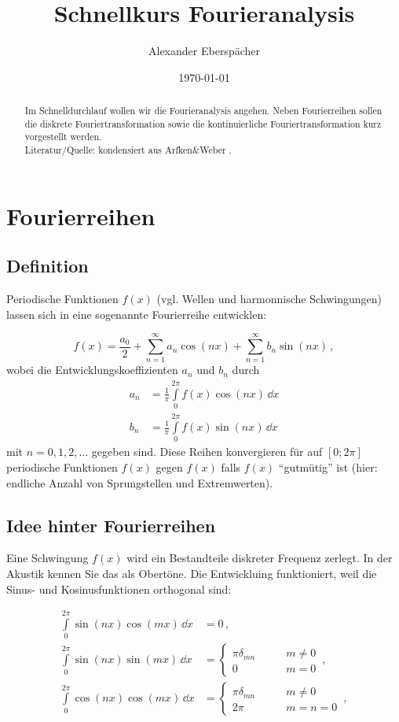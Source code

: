 \documentclass[paper=a4, fontsize=11.0pt, abstractoff, DIV12]{scrartcl}
\title{Schnellkurs Fourieranalysis}
\author{Alexander Eberspächer}
\date{\today}
\begin{document}
\maketitle
\begin{abstract}
Im Schnelldurchlauf wollen wir die Fourieranalysis angehen. Neben Fourierreihen
sollen die diskrete Fouriertransformation sowie die kontinuierliche
Fouriertransformation kurz vorgestellt werden.
\\[0.5ex]
Literatur/Quelle: kondensiert aus Arfken\&Weber \cite{Arfken}.
\end{abstract}

\section{Fourierreihen}

\subsection{Definition}

Periodische Funktionen $f(x)$ (vgl. Wellen und harmonnische Schwingungen)
lassen sich in eine sogenannte Fourierreihe entwicklen:

\begin{equation}
f(x) = \frac{a_0}{2}+\sum\limits_{n=1}^{\infty}a_n\cos(nx) + \sum\limits_{n=1}^{\infty}b_n\sin(nx)\,,
\end{equation}
wobei die Entwicklungskoeffizienten $a_n$ und $b_n$ durch
\begin{align}
a_n &= \frac{1}{\pi}\int\limits_{0}^{2\pi}f(x)\cos(nx)\,\dd x\\
b_n &= \frac{1}{\pi}\int\limits_{0}^{2\pi}f(x)\sin(nx)\,\dd x
\end{align}
mit $n=0,1,2,\dots$ gegeben sind. Diese Reihen konvergieren für auf $[0;2\pi]$
periodische Funktionen $f(x)$ gegen $f(x)$ falls $f(x)$ ``gutmütig'' ist
(hier: endliche Anzahl von Sprungstellen und Extremwerten).

\subsection{Idee hinter Fourierreihen}

Eine Schwingung $f(x)$ wird ein Bestandteile diskreter Frequenz zerlegt. In der
Akustik kennen Sie das als Obertöne. Die Entwickluing funktioniert, weil
die Sinus- und Kosinusfunktionen orthogonal sind:

\begin{align}
\int\limits_{0}^{2\pi} \sin(nx)\cos(mx)\,\dd x&=0\,,\\
\int\limits_{0}^{2\pi} \sin(nx)\sin(mx)\,\dd x &= \left\{\begin{array}{lr}\pi\delta_{mn}&\qquad m\ne 0\\0&\qquad m=0\end{array}\right.\,,\\
\int\limits_{0}^{2\pi} \cos(nx)\cos(mx)\,\dd x&= \left\{\begin{array}{lr}\pi\delta_{mn}&\qquad m\ne 0\\2\pi&\qquad m=n=0\end{array}\right.\,,\\
\end{align}
\end{document}
